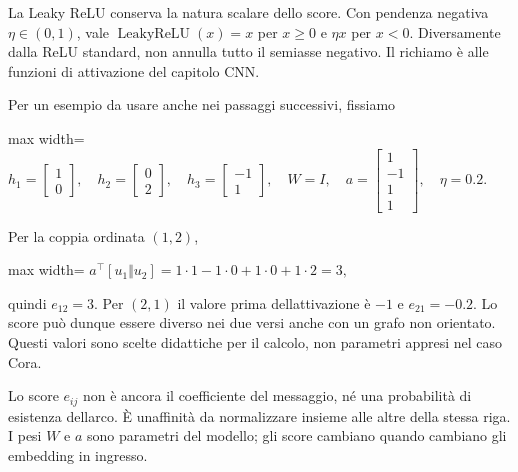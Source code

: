 \documentclass[11pt,a4paper,oneside,openany]{book}
\begin{document}
La Leaky ReLU conserva la natura scalare dello score. Con pendenza negativa \(\eta\in(0,1)\), vale \(\operatorname{LeakyReLU}(x)=x\) per \(x\ge0\) e \(\eta x\) per \(x<0\). Diversamente dalla ReLU standard, non annulla tutto il semiasse negativo. Il richiamo è alle funzioni di attivazione del capitolo CNN.

Per un esempio da usare anche nei passaggi successivi, fissiamo

\begin{center}
\begin{adjustbox}{max width=\linewidth}
$\displaystyle h_1=\begin{bmatrix}1\\0\end{bmatrix},\quad
h_2=\begin{bmatrix}0\\2\end{bmatrix},\quad
h_3=\begin{bmatrix}-1\\1\end{bmatrix},\quad
W=I,\quad a=\begin{bmatrix}1\\-1\\1\\1\end{bmatrix},\quad\eta=0.2.$
\end{adjustbox}
\end{center}

Per la coppia ordinata \((1,2)\),

\begin{center}
\begin{adjustbox}{max width=\linewidth}
$\displaystyle a^\top[u_1\Vert u_2]=1\cdot1-1\cdot0+1\cdot0+1\cdot2=3,$
\end{adjustbox}
\end{center}

quindi \(e_{12}=3\). Per \((2,1)\) il valore prima dell\textquotesingle attivazione è \(-1\) e \(e_{21}=-0.2\). Lo score può dunque essere diverso nei due versi anche con un grafo non orientato. Questi valori sono scelte didattiche per il calcolo, non parametri appresi nel caso Cora.

Lo score \(e_{ij}\) non è ancora il coefficiente del messaggio, né una probabilità di esistenza dell\textquotesingle arco. È un\textquotesingle affinità da normalizzare insieme alle altre della stessa riga. I pesi \(W\) e \(a\) sono parametri del modello; gli score cambiano quando cambiano gli embedding in ingresso.
\end{document}
